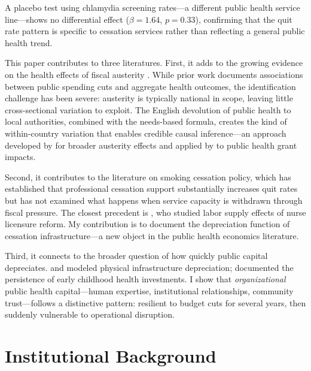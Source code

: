 \documentclass[12pt]{article}
\begin{document}
A placebo test using chlamydia screening rates---a different public health service line---shows no differential effect ($\beta = 1.64$, $p = 0.33$), confirming that the quit rate pattern is specific to cessation services rather than reflecting a general public health trend.

This paper contributes to three literatures. First, it adds to the growing evidence on the health effects of fiscal austerity \citep{stuckler2013body, reeves2015austerity, barr2015suicides, loopstra2016austerity}. While prior work documents associations between public spending cuts and aggregate health outcomes, the identification challenge has been severe: austerity is typically national in scope, leaving little cross-sectional variation to exploit. The English devolution of public health to local authorities, combined with the needs-based formula, creates the kind of within-country variation that enables credible causal inference---an approach developed by \citet{fetzer2019did} for broader austerity effects and applied by \citet{alexiou2021local} to public health grant impacts.

Second, it contributes to the literature on smoking cessation policy, which has established that professional cessation support substantially increases quit rates \citep{stead2012combined, west2013smokefree, bauld2012effectiveness} but has not examined what happens when service capacity is withdrawn through fiscal pressure. The closest precedent is \citet{depasquale2016occupational}, who studied labor supply effects of nurse licensure reform. My contribution is to document the depreciation function of cessation infrastructure---a new object in the public health economics literature.

Third, it connects to the broader question of how quickly public capital depreciates. \citet{barro1990government} and \citet{pritchett2000patterns} modeled physical infrastructure depreciation; \citet{currie2020child} documented the persistence of early childhood health investments. I show that \textit{organizational} public health capital---human expertise, institutional relationships, community trust---follows a distinctive pattern: resilient to budget cuts for several years, then suddenly vulnerable to operational disruption.

\section{Institutional Background}
\end{document}

